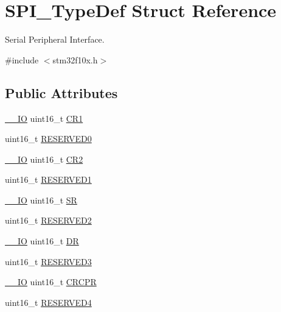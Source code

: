\hypertarget{struct_s_p_i___type_def}{}\section{S\+P\+I\+\_\+\+Type\+Def Struct Reference}
\label{struct_s_p_i___type_def}


Serial Peripheral Interface.  




{\ttfamily \#include $<$stm32f10x.\+h$>$}

\subsection*{Public Attributes}
\begin{DoxyCompactItemize}
\item 
\hyperlink{core__sc300_8h_aec43007d9998a0a0e01faede4133d6be}{\+\_\+\+\_\+\+IO} uint16\+\_\+t \hyperlink{struct_s_p_i___type_def_a1e398155ddd013fcdd41309b4bd0bd5f}{C\+R1}
\item 
uint16\+\_\+t \hyperlink{struct_s_p_i___type_def_a7f16c40933b8a713085436be72d30a46}{R\+E\+S\+E\+R\+V\+E\+D0}
\item 
\hyperlink{core__sc300_8h_aec43007d9998a0a0e01faede4133d6be}{\+\_\+\+\_\+\+IO} uint16\+\_\+t \hyperlink{struct_s_p_i___type_def_ac891e34644b8dc27bacc906cfd18b235}{C\+R2}
\item 
uint16\+\_\+t \hyperlink{struct_s_p_i___type_def_a1b7a800c0f56532a431b19cf868e4102}{R\+E\+S\+E\+R\+V\+E\+D1}
\item 
\hyperlink{core__sc300_8h_aec43007d9998a0a0e01faede4133d6be}{\+\_\+\+\_\+\+IO} uint16\+\_\+t \hyperlink{struct_s_p_i___type_def_a017d7d54a7bf1925facea6b5e02fec83}{SR}
\item 
uint16\+\_\+t \hyperlink{struct_s_p_i___type_def_a09ce56649bb5477e2fcf3e92bca8f735}{R\+E\+S\+E\+R\+V\+E\+D2}
\item 
\hyperlink{core__sc300_8h_aec43007d9998a0a0e01faede4133d6be}{\+\_\+\+\_\+\+IO} uint16\+\_\+t \hyperlink{struct_s_p_i___type_def_ae192c943732b6ab5e5611e860cc05544}{DR}
\item 
uint16\+\_\+t \hyperlink{struct_s_p_i___type_def_aeb1d1d561f1d51232369197fa7acb53a}{R\+E\+S\+E\+R\+V\+E\+D3}
\item 
\hyperlink{core__sc300_8h_aec43007d9998a0a0e01faede4133d6be}{\+\_\+\+\_\+\+IO} uint16\+\_\+t \hyperlink{struct_s_p_i___type_def_a353c64e49ec9ae93b950668941f41175}{C\+R\+C\+PR}
\item 
uint16\+\_\+t \hyperlink{struct_s_p_i___type_def_a20e3ac1445ed1e7a9792ca492c46a73a}{R\+E\+S\+E\+R\+V\+E\+D4}

\end{DoxyCompactItemize}
